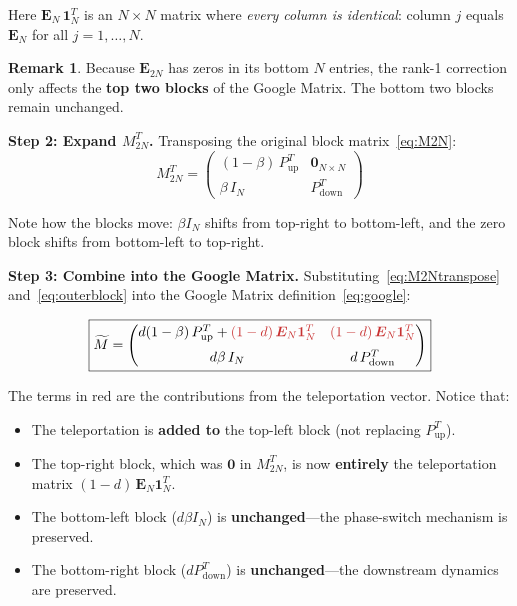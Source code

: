 \documentclass[11pt,a4paper]{article}
\theoremstyle{definition}
\newtheorem{remark}{Remark}
\begin{document}
Here $\bm{E}_N\,\bm{1}_N^T$ is an $N \times N$ matrix where \emph{every column
is identical}: column $j$ equals $\bm{E}_N$ for all $j = 1, \dots, N$.

\begin{remark}
Because $\bm{E}_{2N}$ has zeros in its bottom $N$ entries, the rank-1
correction only affects the \textbf{top two blocks} of the Google Matrix.  The
bottom two blocks remain unchanged.
\end{remark}

\medskip
\noindent\textbf{Step 2: Expand $M_{2N}^T$.}
Transposing the original block matrix~\eqref{eq:M2N}:
\begin{equation}\label{eq:M2Ntranspose}
M_{2N}^T =
\begin{pmatrix}
(1-\beta)\,P_{\text{up}}^T & \bm{0}_{N\times N} \\[4pt]
\beta\,I_N                 & P_{\text{down}}^T
\end{pmatrix}
\end{equation}

Note how the blocks move: $\beta I_N$ shifts from top-right to bottom-left,
and the zero block shifts from bottom-left to top-right.

\medskip
\noindent\textbf{Step 3: Combine into the Google Matrix.}
Substituting~\eqref{eq:M2Ntranspose} and~\eqref{eq:outerblock} into the
Google Matrix definition~\eqref{eq:google}:

\begin{equation}\label{eq:googleblocks}
\boxed{
\widetilde{M} =
\begin{pmatrix}
d(1-\beta)\,P_{\text{up}}^T + {\color{accent}(1-d)\,\bm{E}_N\bm{1}_N^T}
  & {\color{accent}(1-d)\,\bm{E}_N\bm{1}_N^T} \\[6pt]
d\beta\, I_N
  & d\,P_{\text{down}}^T
\end{pmatrix}
}
\end{equation}

The terms in {\color{accent}red} are the contributions from the teleportation
vector.  Notice that:
\begin{itemize}
  \item The teleportation is \textbf{added to} the top-left block (not
        replacing $P_{\text{up}}^T$).
  \item The top-right block, which was $\bm{0}$ in $M_{2N}^T$, is now
        \textbf{entirely} the teleportation matrix
        $(1-d)\,\bm{E}_N\bm{1}_N^T$.
  \item The bottom-left block ($d\beta I_N$) is \textbf{unchanged}---the
        phase-switch mechanism is preserved.
  \item The bottom-right block ($d P_{\text{down}}^T$) is
        \textbf{unchanged}---the downstream dynamics are preserved.
\end{itemize}
\end{document}
